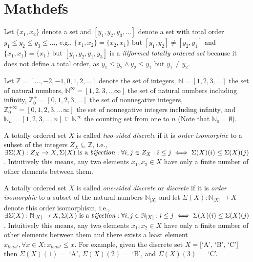 \chapter{Mathdefs}

Let $\{x_1,x_2\}$ denote a set and $[y_1,y_2,y_3,\ldots]$ denote a set
with total order $y_1 \le y_2 \le y_3 \le \ldots$, e.g., $\{x_1,x_2\} = \{x_2,x_1\}$ but
$[y_1,y_2] \ne [y_2,y_1]$ and $\{x_1,x_1\} = \{x_1\}$ but $[ y_1, y_2, y_1, y_3]$
is a \emph{illformed totally ordered set} because it does not define a total order,
as $y_1 \le y_2 \wedge y_2 \le y_1$ but $y_1 \ne y_2$.

Let $\mathbb{Z} = [\ldots,-2,-1,0,1,2,\ldots]$ denote the set of integers,
$\mathbb{N} = [1,2,3,\ldots]$ the set of natural numbers,
$\mathbb{N}^\infty = [1,2,3,\ldots\infty]$ the set of natural numbers including infinity,
$\mathbb{Z}^+_0 = [0,1,2,3,\ldots]$ the set of nonnegative integers,
$\mathbb{Z}^{+\infty}_0 = [0,1,2,3,\ldots\infty]$ the set of nonnegative integers including infinity,
and $\mathbb{N}_n = [1,2,3,\ldots,n] \subseteq \mathbb{N}^\infty$ the counting set from one to $n$
(Note that $\mathbb{N}_0 = \emptyset$).

A totally ordered set $X$ is called \emph{two-sided discrete}
if it is \emph{order isomorphic} to a subset of the integers $Z_X \subseteq \mathbb{Z}$,
i.e., $\exists{\Sigma(X): Z_X \to X, \Sigma(X)\textrm{ is a \emph{bijection}}}:
 \forall{i,j \in Z_X}: i \le j \iff \Sigma(X)(i) \le \Sigma(X)(j)$.
Intuitively this means, any two elements
$x_1, x_2 \in X$ have only a finite number of other elements between them.

A totally ordered set $X$ is called \emph{one-sided discrete} or \emph{discrete}
if it is \emph{order isomorphic} to a subset of the natural numbers $\mathbb{N}_{|X|}$
and let $\Sigma(X): \mathbb{N}_{|X|} \to X$ denote this order isomorphism,
i.e., $\exists{\Sigma(X): \mathbb{N}_{|X|} \to X, \Sigma(X)\textrm{ is a \emph{bijection}}}:
 \forall{i,j \in \mathbb{N}_{|X|}}: i \le j \iff \Sigma(X)(i) \le \Sigma(X)(j)$.
Intuitively this means,
any two elements $x_1, x_2 \in X$ have only a finite number of other elements
between them and there exists a least element $x_{least}, \forall{x \in X}: x_{least} \le x$.
For example, given the discrete set $X = [$`A', `B', `C'$]$ then
$\Sigma(X)(1) =$ `A',  $\Sigma(X)(2) =$ `B', and $\Sigma(X)(3) =$ `C'.

